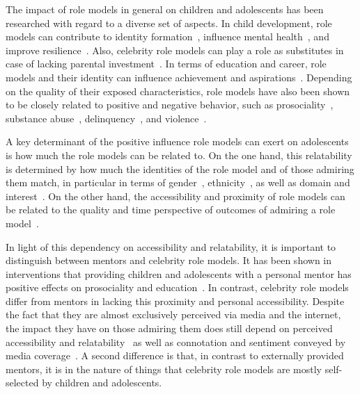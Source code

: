 The impact of role models in general on children and adolescents has been researched with regard to a diverse set of aspects. In child development, role models can contribute to identity formation~\autocite{vecci_behavioural_2019}, influence mental health~\autocite{bird_impact_2012}, and improve resilience~\autocite{werner_resilience_1995}. Also, celebrity role models can play a role as substitutes in case of lacking parental investment~\autocite{cheung_idol_2012}. In terms of education and career, role models and their identity can influence achievement and aspirations~\autocite{zirkel_is_2002, herrmann_effects_2016,christiansen_television_1979}. Depending on the quality of their exposed characteristics, role models have also been shown to be closely related to positive and negative behavior, such as prosociality~\autocite{kosse_formation_2020}, substance abuse~\autocite{yancey_role_2002, hurd_negative_2009}, delinquency~\autocite{walters_someone_2016}, and violence~\autocite{hurd_role_2011}.

A key determinant of the positive influence role models can exert on adolescents is how much the role models can be related to. On the one hand, this relatability is determined by how much the identities of the role model and of those admiring them match, in particular in terms of gender~\autocite{marx_female_2002, herrmann_effects_2016,lockwood_someone_2006}, ethnicity~\autocite{marx_obama_2009}, as well as domain and interest~\autocite{lockwood_superstars_1997}. On the other hand, the accessibility and proximity of role models can be related to the quality and time perspective of outcomes of admiring a role model~\autocite{strasser-burke_who_2020, bird_impact_2012}.

In light of this dependency on accessibility and relatability, it is important to distinguish between mentors and celebrity role models. It has been shown in interventions that providing children and adolescents with a personal mentor has positive effects on prosociality and education~\autocite{kosse_formation_2020, falk_mentoring_2020, dubois_natural_2005,rhodes_agents_2002,heckman_understanding_2013}. In contrast, celebrity role models differ from mentors in lacking this proximity and personal accessibility. Despite the fact that they are almost exclusively perceived via media and the internet, the impact they have on those admiring them does still depend on perceived accessibility and relatability~\autocite{strasser-burke_who_2020, lockwood_superstars_1997} as well as connotation and sentiment conveyed by media coverage~\autocite{lines_villains_2001, adamson_female_2019}. A second difference is that, in contrast to externally provided mentors, it is in the nature of things that celebrity role models are mostly self-selected by children and adolescents.


